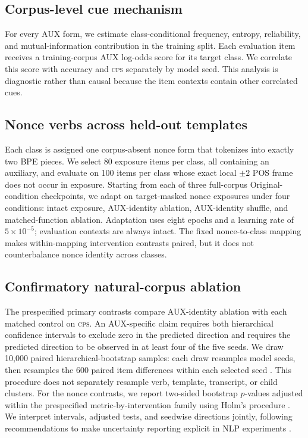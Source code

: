 \documentclass[11pt]{article}
\newcommand{\cps}{\textsc{cps}}
\begin{document}
\subsection{Corpus-level cue mechanism}

For every AUX form, we estimate class-conditional frequency, entropy, reliability, and mutual-information contribution in the training split. Each evaluation item receives a training-corpus AUX log-odds score for its target class. We correlate this score with accuracy and \cps{} separately by model seed. This analysis is diagnostic rather than causal because the item contexts contain other correlated cues.

\subsection{Nonce verbs across held-out templates}

Each class is assigned one corpus-absent nonce form that tokenizes into exactly two BPE pieces. We select 80 exposure items per class, all containing an auxiliary, and evaluate on 100 items per class whose exact local $\pm2$ POS frame does not occur in exposure. Starting from each of three full-corpus Original-condition checkpoints, we adapt on target-masked nonce exposures under four conditions: intact exposure, AUX-identity ablation, AUX-identity shuffle, and matched-function ablation. Adaptation uses eight epochs and a learning rate of $5\times10^{-5}$; evaluation contexts are always intact. The fixed nonce-to-class mapping makes within-mapping intervention contrasts paired, but it does not counterbalance nonce identity across classes.

\subsection{Confirmatory natural-corpus ablation}

The prespecified primary contrasts compare AUX-identity ablation with each matched control on \cps{}. An AUX-specific claim requires both hierarchical confidence intervals to exclude zero in the predicted direction and requires the predicted direction to be observed in at least four of the five seeds. We draw 10,000 paired hierarchical-bootstrap samples: each draw resamples model seeds, then resamples the 600 paired item differences within each selected seed \citep{efron1979}. This procedure does not separately resample verb, template, transcript, or child clusters. For the nonce contrasts, we report two-sided bootstrap $p$-values adjusted within the prespecified metric-by-intervention family using Holm's procedure \citep{holm1979}. We interpret intervals, adjusted tests, and seedwise directions jointly, following recommendations to make uncertainty reporting explicit in NLP experiments \citep{dror2018}.
\end{document}

